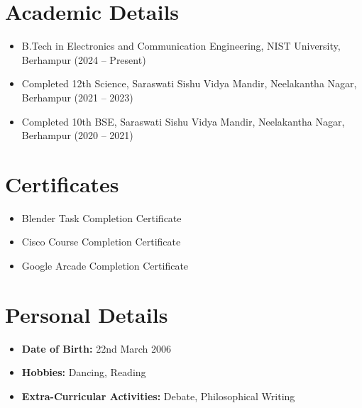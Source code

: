 \documentclass[a4paper,12pt]{article}
\begin{document}
\section{Academic Details}
\begin{itemize}[nosep,after=\strut, leftmargin=1em, itemsep=3pt,label=--]
    \item B.Tech in Electronics and Communication Engineering, NIST University, Berhampur (2024 -- Present)
    \item Completed 12th Science, Saraswati Sishu Vidya Mandir, Neelakantha Nagar, Berhampur (2021 -- 2023)
    \item Completed 10th BSE, Saraswati Sishu Vidya Mandir, Neelakantha Nagar, Berhampur (2020 -- 2021)
\end{itemize}

\section{Certificates}
\begin{itemize}[nosep,after=\strut, leftmargin=1em, itemsep=3pt,label=--]
    \item Blender Task Completion Certificate
    \item Cisco Course Completion Certificate
    \item Google Arcade Completion Certificate
\end{itemize}

\section{Personal Details}
\begin{itemize}[nosep,after=\strut, leftmargin=1em, itemsep=3pt,label=--]
    \item \textbf{Date of Birth:} 22nd March 2006
    \item \textbf{Hobbies:} Dancing, Reading
    \item \textbf{Extra-Curricular Activities:} Debate, Philosophical Writing
\end{itemize}

\vfill
{}
\end{document}
